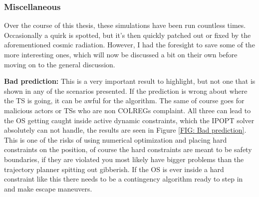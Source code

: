 \subsubsection{Miscellaneous}

Over the course of this thesis, these simulations have been run countless times. Occasionally a quirk is spotted, but it's
then quickly patched out or fixed by the aforementioned cosmic radiation. However, I had the foresight to save some of the more
interesting ones, which will now be discussed a bit on their own before moving on to the general discussion.

\textbf{Bad prediction:}\newline
This is a very important result to highlight, but not one that is shown in any of the scenarios presented. If the prediction is wrong
about where the TS is going, it can be awful for the algorithm. The same of course goes for malicious actors or TSs who are
non COLREGs complaint. All three can lead to the OS getting caught inside active dynamic constraints, which the IPOPT solver
absolutely can not handle, the results are seen in Figure \ref{FIG: Bad prediction}. This is one of the risks of using
numerical optimization and placing hard constraints on the position, of course the hard constraints are meant to be safety boundaries,
if they are violated you most likely have bigger problems than the trajectory planner spitting out gibberish. If the OS is ever
inside a hard constraint like this there needs to be a contingency algorithm ready to step in and make escape maneuvers.

